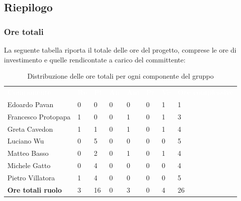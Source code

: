 \subsection{Riepilogo}
\subsubsection{Ore totali}
La seguente tabella riporta il totale delle ore del progetto,  comprese le ore di investimento e quelle rendicontate a carico del committente:
\begin{table}[!htbp]
\begin{center}
\renewcommand{\arraystretch}{1.25}
\begin{tabular}{ m{}<{\centering}  m{}<{\centering} m{}<{\centering} m{}<{\centering}  m{}<{\centering}  m{}<{\centering}  m{}<{\centering}  m{}<{\centering}   }
	\rowcolor{darkblue}
	\textcolor{white}{\textbf{Componente}} &\textcolor{white}{\textbf{Re}}&\textcolor{white}{\textbf{Pt}}&\textcolor{white}{\textbf{An}}&\textcolor{white}{\textbf{Am}}&\textcolor{white}{\textbf{Pr}}&\textcolor{white}{\textbf{Ve}}&\textcolor{white}{\textbf{Ore complessive}}\\ 
	Edoardo Pavan & 0 & 0 & 0 & 0 & 0 & 1 & 1 \\	
	
	Francesco Protopapa & 1 & 0 & 0 & 1 & 0 & 1 & 3 \\

	Greta Cavedon & 1 & 1 & 0 & 1 & 0 & 1 & 4 \\
	
	Luciano Wu & 0 & 5 & 0 & 0 & 0 & 0 &5 \\
	
	Matteo Basso & 0 & 2 & 0 & 1 & 0 & 1 & 4 \\
	
	Michele Gatto & 0 & 4 & 0 & 0 & 0 & 0 & 4 \\
	
	Pietro Villatora & 1 & 4 & 0 & 0 & 0 & 0 & 5 \\
	
	\textbf{Ore totali ruolo} & 3 & 16 & 0 & 3 & 0 & 4 & 26 \\

\end{tabular}
\caption{Distribuzione delle ore totali per ogni componente del gruppo}
\end{center}
\end{table}

